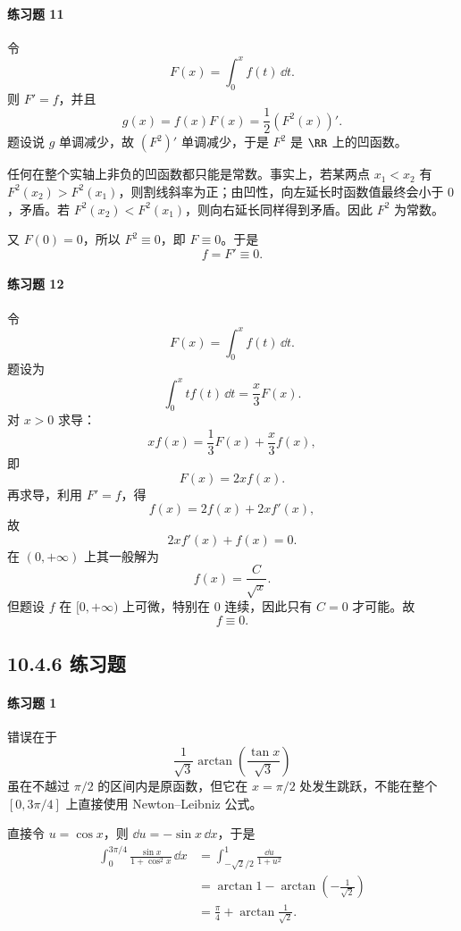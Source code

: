 \paragraph{练习题 11}
\begin{xsolution}
令
\[
  F(x)=\int_0^x f(t)\,\dd t.
\]
则 $F'=f$，并且
\[
  g(x)=f(x)F(x)=\frac12(F^2(x))'.
\]
题设说 $g$ 单调减少，故 $(F^2)'$ 单调减少，于是 $F^2$ 是 $\RR$ 上的凹函数。

任何在整个实轴上非负的凹函数都只能是常数。事实上，若某两点 $x_1<x_2$ 有 $F^2(x_2)>F^2(x_1)$，则割线斜率为正；由凹性，向左延长时函数值最终会小于 $0$，矛盾。若 $F^2(x_2)<F^2(x_1)$，则向右延长同样得到矛盾。因此 $F^2$ 为常数。

又 $F(0)=0$，所以 $F^2\equiv0$，即 $F\equiv0$。于是
\[
  f=F'\equiv0.
\]
\end{xsolution}

\paragraph{练习题 12}
\begin{xsolution}
令
\[
  F(x)=\int_0^x f(t)\,\dd t.
\]
题设为
\[
  \int_0^x t f(t)\,\dd t=\frac x3F(x).
\]
对 $x>0$ 求导：
\[
  x f(x)=\frac13F(x)+\frac x3 f(x),
\]
即
\[
  F(x)=2x f(x).
\]
再求导，利用 $F'=f$，得
\[
  f(x)=2f(x)+2x f'(x),
\]
故
\[
  2x f'(x)+f(x)=0.
\]
在 $(0,+\infty)$ 上其一般解为
\[
  f(x)=\frac C{\sqrt x}.
\]
但题设 $f$ 在 $[0,+\infty)$ 上可微，特别在 $0$ 连续，因此只有 $C=0$ 才可能。故
\[
  \boxed{f\equiv0}.
\]
\end{xsolution}

\subsection*{10.4.6 练习题}

\paragraph{练习题 1}
\begin{xsolution}
错误在于
\[
  \frac1{\sqrt3}\arctan\left(\frac{\tan x}{\sqrt3}\right)
\]
虽在不越过 $\pi/2$ 的区间内是原函数，但它在 $x=\pi/2$ 处发生跳跃，不能在整个 $[0,3\pi/4]$ 上直接使用 Newton--Leibniz 公式。

直接令 $u=\cos x$，则 $\dd u=-\sin x\,\dd x$，于是
\begin{align*}
  \int_0^{3\pi/4}\frac{\sin x}{1+\cos^2x}\,\dd x
  &=\int_{-\sqrt2/2}^{1}\frac{\dd u}{1+u^2}\\
  &=\arctan1-\arctan\left(-\frac1{\sqrt2}\right)\\
  &=\boxed{\frac\pi4+\arctan\frac1{\sqrt2}}.
\end{align*}
\end{xsolution}

